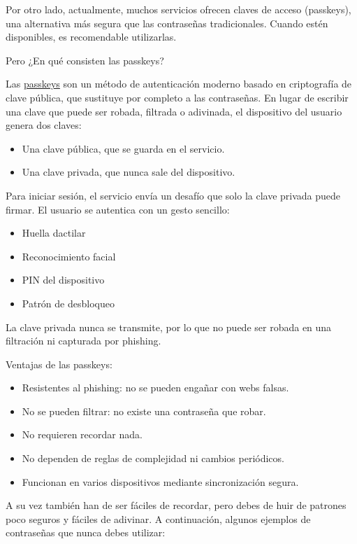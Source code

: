 \documentclass[
  spanish,
  a4paper,
  openany]{book}
\begin{document}
Por otro lado, actualmente, muchos servicios ofrecen claves de acceso (passkeys), una alternativa más segura que las contraseñas tradicionales. Cuando estén disponibles, es recomendable utilizarlas.

Pero ¿En qué consisten las passkeys?

Las \href{https://www.eset.com/latam/blog/cultura-y-seguridad-digital/que-es-una-passkey-y-por-que-es-mejor-que-una-contrasena-tradicional/}{passkeys} son un método de autenticación moderno basado en criptografía de clave pública, que sustituye por completo a las contraseñas. En lugar de escribir una clave que puede ser robada, filtrada o adivinada, el dispositivo del usuario genera dos claves:

\begin{itemize}
\item
  Una clave pública, que se guarda en el servicio.
\item
  Una clave privada, que nunca sale del dispositivo.
\end{itemize}

Para iniciar sesión, el servicio envía un desafío que solo la clave privada puede firmar. El usuario se autentica con un gesto sencillo:

\begin{itemize}
\item
  Huella dactilar
\item
  Reconocimiento facial
\item
  PIN del dispositivo
\item
  Patrón de desbloqueo
\end{itemize}

La clave privada nunca se transmite, por lo que no puede ser robada en una filtración ni capturada por phishing.

Ventajas de las passkeys:

\begin{itemize}
\item
  Resistentes al phishing: no se pueden engañar con webs falsas.
\item
  No se pueden filtrar: no existe una contraseña que robar.
\item
  No requieren recordar nada.
\item
  No dependen de reglas de complejidad ni cambios periódicos.
\item
  Funcionan en varios dispositivos mediante sincronización segura.
\end{itemize}

A su vez también han de ser fáciles de recordar, pero debes de huir de patrones poco seguros y fáciles de adivinar. A continuación, algunos ejemplos de contraseñas que nunca debes utilizar:
\end{document}
